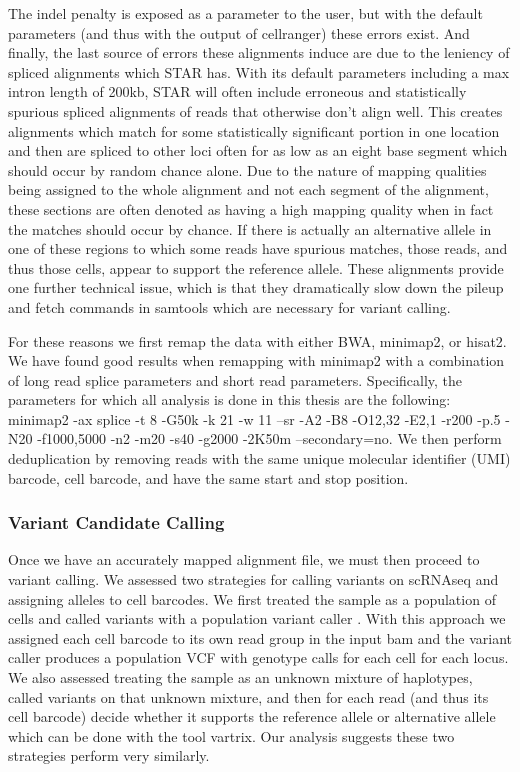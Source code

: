\par{
The indel penalty is exposed as a parameter to the user, but with the default parameters (and thus with the output of cellranger) these errors exist. 
And finally, the last source of errors these alignments induce are due to the leniency of spliced alignments which STAR has. With its default parameters including 
a max intron length of 200kb, STAR will often include erroneous and statistically spurious spliced alignments of reads that otherwise don't align well. This creates alignments 
which match for some statistically significant portion in one location and then are spliced to other loci often for as low as an eight base segment which should occur by 
random chance alone. Due to the nature of mapping qualities being assigned to the whole alignment and not each segment of the alignment, these sections are often denoted as 
having a high mapping quality when in fact the matches should occur by chance. If there is actually an alternative allele in one of these regions to which some reads have 
spurious matches, those reads, and thus those cells, appear to support the reference allele. These alignments provide one further technical 
issue, which is that they dramatically slow down the pileup and fetch commands in samtools \cite{samtools} which are necessary for variant calling. 
}
\par{
For these reasons we first remap the data with either BWA, minimap2, or hisat2. We have found good results when remapping with minimap2 with a combination 
of long read splice parameters and short read parameters. Specifically, the parameters for which all analysis is done in this thesis are the following: 
minimap2 -ax splice -t 8 -G50k -k 21 -w 11 --sr -A2 -B8 -O12,32 -E2,1 -r200 -p.5 -N20 -f1000,5000 -n2 -m20 -s40 -g2000 -2K50m --secondary=no. We then perform 
deduplication by removing reads with the same unique molecular identifier (UMI) barcode, cell barcode, and have the same start and stop position.
}


\subsubsection{Variant Candidate Calling}
\par{
Once we have an accurately mapped alignment file, we must then proceed to variant calling. We assessed two strategies for calling variants on scRNAseq and assigning alleles to cell barcodes. We first treated 
the sample as a population of cells and called variants with a population variant caller \cite{freebayes} \cite{gatk} \cite{samtools}. With this approach we assigned each cell barcode to its own read group in the input bam and the variant caller produces a population VCF with genotype calls for each cell for each locus.
We also assessed treating the sample as an unknown mixture of haplotypes, called variants on that unknown mixture, and then for each read (and thus its cell barcode) decide whether it supports the reference allele or alternative allele which can be done with the tool vartrix\cite{vartrix}. Our analysis suggests these two strategies perform very similarly. 
}
